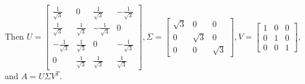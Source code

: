 \documentclass[10pt,english]{article}
\begin{document}
\begin{enumerate}
\begin{enumerate}
        Then $U=\begin{bmatrix}\frac{1}{\sqrt{3}}&0&\frac{1}{\sqrt{3}}&-\frac{1}{\sqrt{3}}\\\frac{1}{\sqrt{3}}&\frac{1}{\sqrt{3}}&-\frac{1}{\sqrt{3}}&0\\-\frac{1}{\sqrt{3}}&\frac{1}{\sqrt{3}}&0&-\frac{1}{\sqrt{3}}\\0&\frac{1}{\sqrt{3}}&\frac{1}{\sqrt{3}}&\frac{1}{\sqrt{3}}\end{bmatrix}, \Sigma=\begin{bmatrix}\sqrt{3}&0&0\\0&\sqrt{3}&0\\0&0&\sqrt{3}\end{bmatrix}, V=\begin{bmatrix}1&0&0\\0&1&0\\0&0&1\end{bmatrix}$, and $A=U\Sigma V^T$. 
    \end{enumerate}
    

\end{enumerate}
\end{document}

